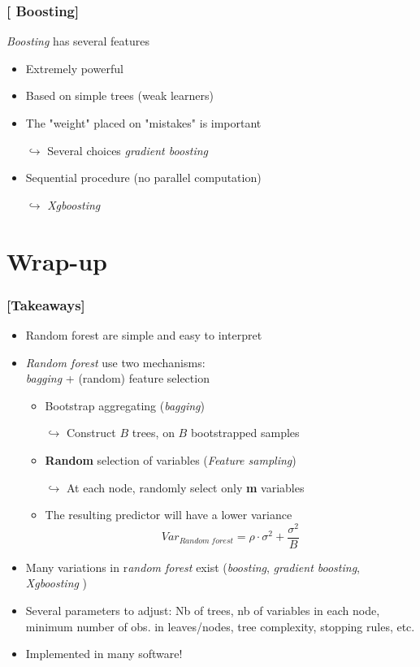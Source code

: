 \documentclass[xcolor=x11names,compress, handhouts]{beamer}
\renewcommand{\(}{\begin{columns}}
\renewcommand{\)}{\end{columns}}
\newcommand{\<}[1]{\begin{column}{#1}}
\renewcommand{\>}{\end{column}}
\begin{document}
\begin{frame}
\frametitle{\textcolor{brique}{[ Boosting]}}
\textit{Boosting} has several features
\pause
 \begin{itemize}[<+->]
    \item  Extremely powerful
    \item  Based on simple trees (weak learners)
     \item The "weight" placed on "mistakes" is important
    \item[$\hookrightarrow$] Several choices \textit{gradient boosting}
    \item Sequential procedure (no parallel computation)
    \item[$\hookrightarrow$] \textit{Xgboosting}
 \end{itemize}
\end{frame}
%


\section{Wrap-up}

\begin{frame} %
\frametitle{\textcolor{brique}{[Takeaways]}}
\begin{itemize}[<+->]
\item Random forest are simple and easy to interpret
\item\textit{Random forest} use two mechanisms: \\
 \textit{bagging} + (random) feature selection
\begin{itemize}[<+->]
    \item Bootstrap aggregating (\textit{bagging})
    \item[$\hookrightarrow$] Construct $B$ trees, on $B$ bootstrapped samples
    \item \textbf{Random} selection of variables (\textit{Feature sampling})
    \item[$\hookrightarrow$] At each node, randomly select only \textbf{m} variables
    \item The resulting predictor will have a lower variance
    $$
Var_{Random \; forest} = \rho \cdot \sigma^{2} + \frac{\sigma^{2}}{B}
$$
    \end{itemize}
\item Many variations in r\emph{andom forest} exist (\textit{boosting}, \textit{gradient boosting}, \textit{Xgboosting} )
\item Several parameters to adjust: Nb of trees,  nb of variables in each node, minimum number of obs. in leaves/nodes,  tree complexity, stopping rules, etc.
\item  Implemented in many software!
\end{itemize}
\end{frame}
\end{document}
